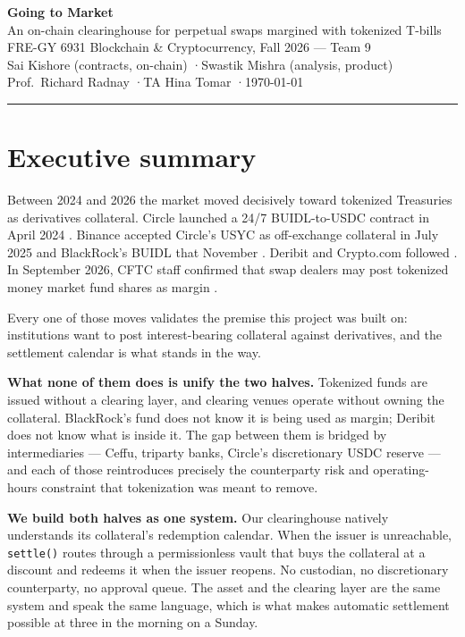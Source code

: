 \documentclass[11pt,a4paper]{article}
\begin{document}
\begin{center}
{\LARGE\bfseries Going to Market}\\[4pt]
{\large An on-chain clearinghouse for perpetual swaps margined with tokenized T-bills}\\[10pt]
{\normalsize FRE-GY 6931 Blockchain \& Cryptocurrency, Fall 2026 — Team 9}\\[2pt]
{\small Sai Kishore (contracts, on-chain) \quad·\quad Swastik Mishra (analysis, product)}\\[2pt]
{\small Prof.\ Richard Radnay \quad·\quad TA Hina Tomar \quad·\quad \today}
\end{center}
\vspace{4pt}
\hrule
\vspace{14pt}

\section*{Executive summary}

Between 2024 and 2026 the market moved decisively toward tokenized Treasuries as derivatives
collateral. Circle launched a 24/7 BUIDL-to-USDC contract in April 2024 \cite{circle}. Binance
accepted Circle's USYC as off-exchange collateral in July 2025 and BlackRock's BUIDL that November
\cite{binance,protofire}. Deribit and Crypto.com followed \cite{deribit}. In September 2026, CFTC
staff confirmed that swap dealers may post tokenized money market fund shares as margin
\cite{protofire}.

Every one of those moves validates the premise this project was built on: institutions want to post
interest-bearing collateral against derivatives, and the settlement calendar is what stands in the
way.

\textbf{What none of them does is unify the two halves.} Tokenized funds are issued without a
clearing layer, and clearing venues operate without owning the collateral. BlackRock's fund does not
know it is being used as margin; Deribit does not know what is inside it. The gap between them is
bridged by intermediaries --- Ceffu, triparty banks, Circle's discretionary USDC reserve --- and each
of those reintroduces precisely the counterparty risk and operating-hours constraint that
tokenization was meant to remove.

\textbf{We build both halves as one system.} Our clearinghouse natively understands its collateral's
redemption calendar. When the issuer is unreachable, \texttt{settle()} routes through a permissionless
vault that buys the collateral at a discount and redeems it when the issuer reopens. No custodian, no
discretionary counterparty, no approval queue. The asset and the clearing layer are the same system
and speak the same language, which is what makes automatic settlement possible at three in the
morning on a Sunday.
\end{document}
